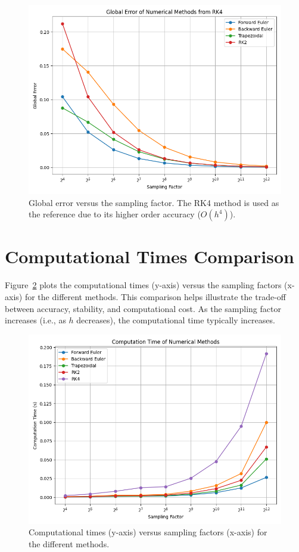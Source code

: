 \documentclass[12pt]{article}
\begin{document}
\begin{figure}[htbp]
  \centering
  \includegraphics[width=\textwidth]{figs/global_error.png}
  \caption{Global error versus the sampling factor. The RK4 method is used as the reference due to its higher order accuracy ($O(h^4)$).}
  \label{fig:global_error}
\end{figure}

\section{Computational Times Comparison}
Figure~\ref{fig:comp_times} plots the computational times (y-axis) versus the sampling factors (x-axis) for the different methods. This comparison helps illustrate the trade-off between accuracy, stability, and computational cost. As the sampling factor increases (i.e., as $h$ decreases), the computational time typically increases. 

\begin{figure}[htbp]
  \centering
  \includegraphics[width=\textwidth]{figs/computation_time.png}
  \caption{Computational times (y-axis) versus sampling factors (x-axis) for the different methods.}
  \label{fig:comp_times}
\end{figure}
\end{document}
